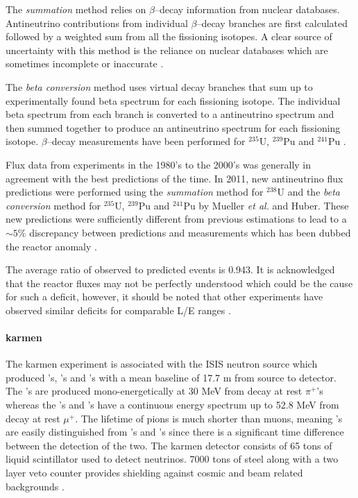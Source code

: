 The \textit{summation} method relies on $\beta$--decay information from nuclear databases. Antineutrino contributions from individual $\beta$--decay branches are first calculated followed by a weighted sum from all the fissioning isotopes. A clear source of uncertainty with this method is the reliance on nuclear databases which are sometimes incomplete or inaccurate \cite{snowmass_2021}. 

The \textit{beta conversion} method uses virtual decay branches that sum up to experimentally found beta spectrum for each fissioning isotope. The individual beta spectrum from each branch is converted to a antineutrino spectrum and then summed together to produce an antineutrino spectrum for each fissioning isotope. $\beta$--decay measurements have been performed for $^{235}$U, $^{239}$Pu and $^{241}$Pu \cite{snowmass_2021}.

Flux data from experiments in the 1980's to the 2000's was generally in agreement with the best predictions of the time. In 2011, new antineutrino flux predictions were performed using the \textit{summation} method for $^{238}$U and the \textit{beta conversion} method for $^{235}$U, $^{239}$Pu and $^{241}$Pu by Mueller \textit{et al.} and Huber. These new predictions were sufficiently different from previous estimations to lead to a $\sim5\%$ discrepancy between predictions and measurements which has been dubbed the reactor anomaly \cite{snowmass_2021}. 

The average ratio of observed to predicted events is 0.943. It is acknowledged that the reactor fluxes may not be perfectly understood which could be the cause for such a deficit, however, it should be noted that other experiments have observed similar deficits for comparable L/E ranges \cite{Reactor_anomaly}.

\paragraph{\gls{karmen}}
The \gls{karmen} experiment is associated with the ISIS neutron source which produced \numu's, \numubar's and \nue's with a mean baseline of 17.7 m from source to detector. The \numu's are produced mono-energetically at 30 MeV from decay at rest $\pi^+$'s whereas the \numubar's and \nue's have a continuous energy spectrum up to 52.8 MeV from decay at rest $\mu^+$. The lifetime of pions is much shorter than muons, meaning \numu's are easily distinguished from \numubar's and \nue's since there is a significant time difference between the detection of the two. The \gls{karmen} detector consists of 65 tons of liquid scintillator used to detect neutrinos. 7000 tons of steel along with a two layer veto counter provides shielding against cosmic and beam related backgrounds \cite{Upper_limits_for_neutrino_oscillations_numubar_to_nuebar_from_muon_decay_at_rest}. 

